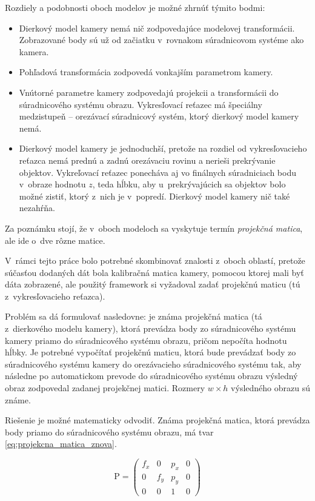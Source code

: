Rozdiely a podobnosti oboch modelov je možné zhrnúť týmito bodmi:
\begin{itemize}
    \item Dierkový model kamery nemá nič zodpovedajúce modelovej transformácii. Zobrazované body sú už od začiatku v~rovnakom súradnicovom systéme ako kamera.
    \item Pohľadová transformácia zodpovedá vonkajším parametrom kamery.
    \item Vnútorné parametre kamery zodpovedajú projekcii a transformácii do súradnicového systému obrazu. Vykresľovací reťazec má špeciálny medzistupeň -- orezávací súradnicový systém, ktorý dierkový model kamery nemá.
    \item Dierkový model kamery je jednoduchší, pretože na rozdiel od vykresľovacieho reťazca nemá prednú a zadnú orezávaciu rovinu a nerieši prekrývanie objektov. Vykreľovací reťazec ponecháva aj vo finálnych súradniciach bodu v~obraze hodnotu $z$, teda hĺbku, aby u~prekrývajúcich sa objektov bolo možné zistiť, ktorý z~nich je v~popredí. Dierkový model kamery nič také nezahŕňa.
\end{itemize}

Za poznámku stojí, že v~oboch modeloch sa vyskytuje termín \emph{projekčná matica}, ale ide o~dve rôzne matice.

V~rámci tejto práce bolo potrebné skombinovať znalosti z~oboch oblastí, pretože súčasťou dodaných dát bola kalibračná matica kamery, pomocou ktorej mali byť dáta zobrazené, ale použitý framework si vyžadoval zadať projekčnú maticu (tú z~vykresľovacieho reťazca).

Problém sa dá formulovať nasledovne: je známa projekčná matica (tá z~dierkového modelu kamery), ktorá prevádza body zo súradnicového systému kamery priamo do súradnicového systému obrazu, pričom nepočíta hodnotu hĺbky. Je potrebné vypočítať projekčnú maticu, ktorá bude prevádzať body zo súradnicového systému kamery do orezávacieho súradnicového systému tak, aby následne po automatickom prevode do súradnicového systému obrazu výsledný obraz zodpovedal zadanej projekčnej matici. Rozmery $w \times h$ výsledného obrazu sú známe.

Riešenie je možné matematicky odvodiť. Známa projekčná matica, ktorá prevádza body priamo do súradnicového systému obrazu, má tvar \ref{eq:projekcna_matica_znova}.

\begin{equation}
\mathrm{P} =
\begin{pmatrix}
f_x & 0 & p_x & 0 \\
0 & f_y & p_y & 0 \\
0 & 0 &  1  & 0
\end{pmatrix}
\label{eq:projekcna_matica_znova}
\end{equation}

